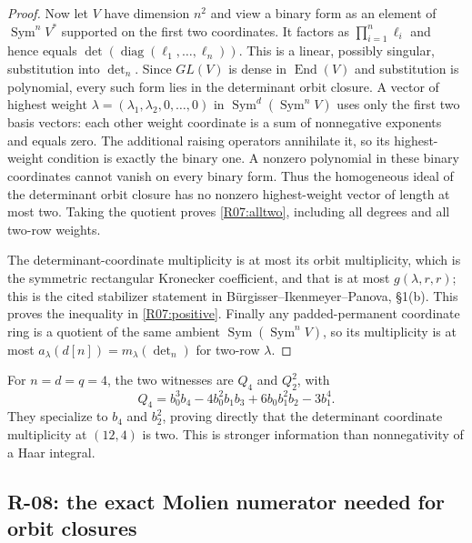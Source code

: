 \documentclass[11pt,a4paper]{article}
\theoremstyle{definition}\newtheorem{definition}{Definition}
\begin{document}
\begin{proof}
Now let $V$ have dimension $n^2$ and view a binary form as an element
of $\operatorname{Sym}^nV^*$ supported on the first two coordinates.
It factors as $\prod_{i=1}^n\ell_i$ and hence equals
$\det(\operatorname{diag}(\ell_1,\ldots,\ell_n))$.
This is a linear, possibly singular, substitution into $\det_n$.
Since $GL(V)$ is dense in $\operatorname{End}(V)$ and substitution
is polynomial, every such form lies in the determinant orbit closure.
A vector of highest weight $\lambda=(\lambda_1,\lambda_2,0,\ldots,0)$
in $\operatorname{Sym}^d(\operatorname{Sym}^nV)$ uses only the first
two basis vectors: each other weight coordinate is a sum of
nonnegative exponents and equals zero. The additional raising
operators annihilate it, so its highest-weight condition is exactly
the binary one. A nonzero polynomial in these binary coordinates
cannot vanish on every binary form. Thus the homogeneous ideal of
the determinant orbit closure has no nonzero highest-weight vector
of length at most two. Taking the quotient proves
\eqref{R07:alltwo}, including all degrees and all two-row weights.

The determinant-coordinate multiplicity is at most its orbit
multiplicity, which is the symmetric rectangular Kronecker coefficient,
and that is at most $g(\lambda,r,r)$; this is the cited stabilizer
statement in B\"urgisser--Ikenmeyer--Panova, \S1(b).
This proves the inequality in \eqref{R07:positive}. Finally any
padded-permanent coordinate ring is a quotient of the same ambient
$\operatorname{Sym}(\operatorname{Sym}^nV)$, so its multiplicity is
at most $a_\lambda(d[n])=m_\lambda(\det_n)$ for two-row $\lambda$.
\end{proof}

For $n=d=q=4$, the two witnesses are $Q_4$ and $Q_2^2$, with
\[
 Q_4=b_0^3b_4-4b_0^2b_1b_3+6b_0b_1^2b_2-3b_1^4.
\]
They specialize to $b_4$ and $b_2^2$, proving directly that the
determinant coordinate multiplicity at $(12,4)$ is two. This is
stronger information than nonnegativity of a Haar integral.

\subsection{R-08: the exact Molien numerator needed for orbit closures}
\end{document}
